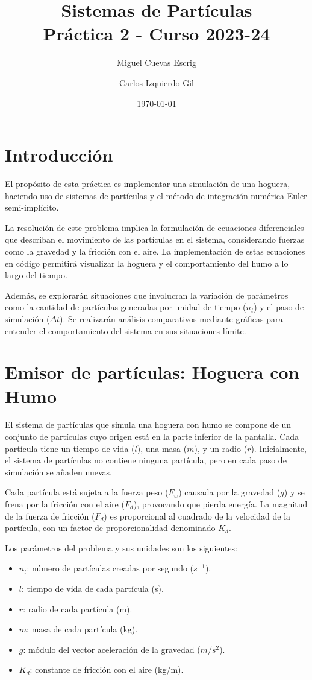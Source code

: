 \documentclass{article}
\title{Sistemas de Partículas \\ \large{Práctica 2 - Curso 2023-24}}
\author{Miguel Cuevas Escrig \and Carlos Izquierdo Gil}
\date{\today}
\begin{document}
\maketitle
\tableofcontents
\section{Introducción}

El propósito de esta práctica es implementar una simulación de una hoguera, haciendo uso de sistemas de partículas y el método de integración numérica Euler semi-implícito.

La resolución de este problema implica la formulación de ecuaciones diferenciales que describan el movimiento de las partículas en el sistema, considerando fuerzas como la gravedad y la fricción con el aire. La implementación de estas ecuaciones en código permitirá visualizar la hoguera y el comportamiento del humo a lo largo del tiempo.

Además, se explorarán situaciones que involucran la variación de parámetros como la cantidad de partículas generadas por unidad de tiempo ($n_t$) y el paso de simulación ($\Delta t$). Se realizarán análisis comparativos mediante gráficas para entender el comportamiento del sistema en sus situaciones límite.

\section{Emisor de partículas: Hoguera con Humo}

El sistema de partículas que simula una hoguera con humo se compone de un conjunto de partículas cuyo origen está en la parte inferior de la pantalla. Cada partícula tiene un tiempo de vida (\(l\)), una masa (\(m\)), y un radio (\(r\)). Inicialmente, el sistema de partículas no contiene ninguna partícula, pero en cada paso de simulación se añaden nuevas.

Cada partícula está sujeta a la fuerza peso (\(F_w\)) causada por la gravedad (\(g\)) y se frena por la fricción con el aire (\(F_d\)), provocando que pierda energía. La magnitud de la fuerza de fricción (\(F_d\)) es proporcional al cuadrado de la velocidad de la partícula, con un factor de proporcionalidad denominado \(K_d\).

Los parámetros del problema y sus unidades son los siguientes:
\begin{itemize}
    \item \(n_t\): número de partículas creadas por segundo (\(s^{-1}\)).
    \item \(l\): tiempo de vida de cada partícula (s).
    \item \(r\): radio de cada partícula (m).
    \item \(m\): masa de cada partícula (kg).
    \item \(g\): módulo del vector aceleración de la gravedad (\(m/s^2\)).
    \item \(K_d\): constante de fricción con el aire (kg/m).
\end{itemize}
\end{document}
